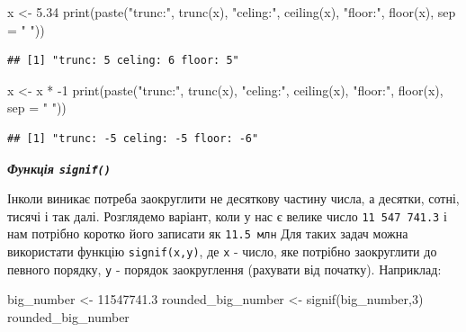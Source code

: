 \documentclass[
]{book}
\newenvironment{Shaded}{\begin{snugshade}}{\end{snugshade}}
\newcommand{\AttributeTok}[1]{\textcolor[rgb]{0.77,0.63,0.00}{#1}}
\newcommand{\DecValTok}[1]{\textcolor[rgb]{0.00,0.00,0.81}{#1}}
\newcommand{\FloatTok}[1]{\textcolor[rgb]{0.00,0.00,0.81}{#1}}
\newcommand{\FunctionTok}[1]{\textcolor[rgb]{0.00,0.00,0.00}{#1}}
\newcommand{\NormalTok}[1]{#1}
\newcommand{\OtherTok}[1]{\textcolor[rgb]{0.56,0.35,0.01}{#1}}
\newcommand{\SpecialCharTok}[1]{\textcolor[rgb]{0.00,0.00,0.00}{#1}}
\newcommand{\StringTok}[1]{\textcolor[rgb]{0.31,0.60,0.02}{#1}}
\begin{document}
\begin{Shaded}
\begin{Highlighting}[]
\NormalTok{x }\OtherTok{\textless{}{-}} \FloatTok{5.34}
\FunctionTok{print}\NormalTok{(}\FunctionTok{paste}\NormalTok{(}\StringTok{"trunc:"}\NormalTok{, }\FunctionTok{trunc}\NormalTok{(x), }\StringTok{"celing:"}\NormalTok{, }\FunctionTok{ceiling}\NormalTok{(x), }\StringTok{"floor:"}\NormalTok{, }\FunctionTok{floor}\NormalTok{(x), }\AttributeTok{sep =} \StringTok{" "}\NormalTok{))}
\end{Highlighting}
\end{Shaded}

\begin{verbatim}
## [1] "trunc: 5 celing: 6 floor: 5"
\end{verbatim}

\begin{Shaded}
\begin{Highlighting}[]
\NormalTok{x }\OtherTok{\textless{}{-}}\NormalTok{ x }\SpecialCharTok{*} \SpecialCharTok{{-}}\DecValTok{1}
\FunctionTok{print}\NormalTok{(}\FunctionTok{paste}\NormalTok{(}\StringTok{"trunc:"}\NormalTok{, }\FunctionTok{trunc}\NormalTok{(x), }\StringTok{"celing:"}\NormalTok{, }\FunctionTok{ceiling}\NormalTok{(x), }\StringTok{"floor:"}\NormalTok{, }\FunctionTok{floor}\NormalTok{(x), }\AttributeTok{sep =} \StringTok{" "}\NormalTok{))}
\end{Highlighting}
\end{Shaded}

\begin{verbatim}
## [1] "trunc: -5 celing: -5 floor: -6"
\end{verbatim}

\emph{\textbf{Функція \texttt{signif()}}}

Інколи виникає потреба заокруглити не десяткову частину числа, а десятки, сотні, тисячі і так далі. Розглядемо варіант, коли у нас є велике число \texttt{11\ 547\ 741.3} і нам потрібно коротко його записати як \texttt{11.5\ млн} Для таких задач можна використати функцію \texttt{signif(x,y)}, де \texttt{x} - число, яке потрібно заокруглити до певного порядку, \texttt{y} - порядок заокруглення (рахувати від початку). Наприклад:

\begin{Shaded}
\begin{Highlighting}[]
\NormalTok{big\_number }\OtherTok{\textless{}{-}} \FloatTok{11547741.3}
\NormalTok{rounded\_big\_number }\OtherTok{\textless{}{-}} \FunctionTok{signif}\NormalTok{(big\_number,}\DecValTok{3}\NormalTok{)}
\NormalTok{rounded\_big\_number}
\end{Highlighting}
\end{Shaded}
\end{document}

